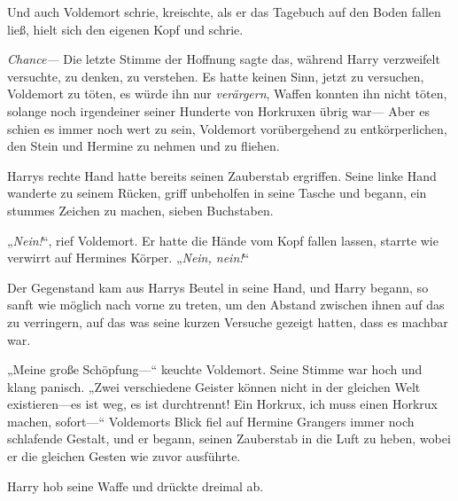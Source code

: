 Und auch Voldemort schrie, kreischte, als er das Tagebuch auf den Boden fallen ließ, hielt sich den eigenen Kopf und schrie.

\emph{Chance—}
%
Die letzte Stimme der Hoffnung sagte das, während Harry verzweifelt versuchte, zu denken, zu verstehen. Es hatte keinen Sinn, jetzt zu versuchen, Voldemort zu töten, es würde ihn nur \emph{verärgern}, Waffen konnten ihn nicht töten, solange noch irgendeiner seiner Hunderte von Horkruxen übrig war—
Aber es schien es immer noch wert zu sein, Voldemort vorübergehend zu entkörperlichen, den Stein und Hermine zu nehmen und zu fliehen.

Harrys rechte Hand hatte bereits seinen Zauberstab ergriffen. Seine linke Hand wanderte zu seinem Rücken, griff unbeholfen in seine Tasche und begann, ein stummes Zeichen zu machen, sieben Buchstaben.

„\emph{Nein!}“, rief Voldemort. Er hatte die Hände vom Kopf fallen lassen, starrte wie verwirrt auf Hermines Körper. „\emph{Nein, nein!}“

Der Gegenstand kam aus Harrys Beutel in seine Hand, und Harry begann, so sanft wie möglich nach vorne zu treten, um den Abstand zwischen ihnen auf das zu verringern, auf das was seine kurzen Versuche gezeigt hatten, dass es machbar war.

„Meine große Schöpfung—“ keuchte Voldemort. Seine Stimme war hoch und klang panisch. „Zwei verschiedene Geister können nicht in der gleichen Welt existieren—es ist weg, es ist durchtrennt! Ein Horkrux, ich muss einen Horkrux machen, sofort—“
Voldemorts Blick fiel auf Hermine Grangers immer noch schlafende Gestalt, und er begann, seinen Zauberstab in die Luft zu heben, wobei er die gleichen Gesten wie zuvor ausführte.

Harry hob seine Waffe und drückte dreimal ab.

